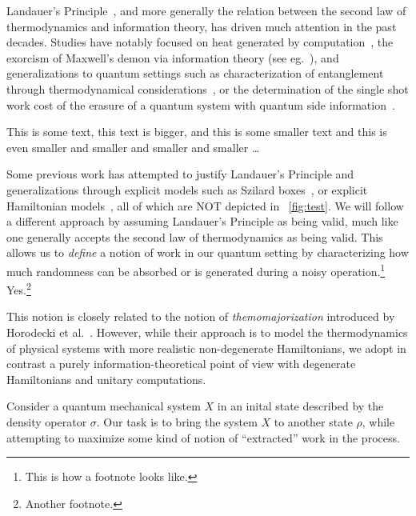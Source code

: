 \documentclass[11pt,a4paper]{article}
\theoremstyle{plain}
\begin{document}
Landauer's Principle~\cite{Landauer1961_5392446Erasure}, and more generally the relation between the second law
of thermodynamics and information theory, has driven much attention in the past decades. Studies have notably
focused on heat generated by computation~\cite{Bennett1982IJTP_ThermodynOfComp}, the exorcism of Maxwell's demon
via information theory (see eg.~\cite{Bennett2003_NotesLP}), and generalizations to quantum settings such as
characterization of entanglement through thermodynamical
considerations~\cite{Oppenheim2002PRL_thermodynamical}, or the determination of the single shot work cost of
the erasure of a quantum system with quantum side information~\cite{delRio2011Nature}.

This is some text, {\notesmaller[1.2] this text is bigger, {\notesmaller[0.8] and this is
    some smaller text {\notesmaller and this is even smaller {\notesmaller and smaller
        {\notesmaller and smaller {\notesmaller and smaller \ldots}}}}}}

Some previous work has attempted to justify Landauer's Principle and generalizations
through explicit models such as Szilard
boxes~\cite{Szilard1929ZeitschriftFuerPhysik,Dahlsten2011NJP_inadequacy}, or explicit
Hamiltonian models~\cite{Alicki2004_hamiltonian}, all of which are NOT depicted in
\figurename~\ref{fig:test}. We will follow a different approach by assuming Landauer's
Principle as being valid, much like one generally accepts the second law of thermodynamics
as being valid. This allows us to {\em define} a notion of work in our quantum setting by
characterizing how much randomness can be absorbed or is generated during a noisy
operation.\footnote{This is how a footnote looks like.} Yes.\footnote{Another footnote.}

This notion is closely related to the notion of {\em themomajorization} introduced by
Horodecki et al.~\cite{Horodecki2013_ThermoMaj}. However, while their approach is to model
the thermodynamics of physical systems with more realistic non-degenerate Hamiltonians, we
adopt in contrast a purely information-theoretical point of view with degenerate
Hamiltonians and unitary computations.

Consider a quantum mechanical system $X$ in an inital state described by the density operator $\sigma$.
Our task is to bring the system $X$ to another state $\rho$, while attempting to maximize some kind of notion
of ``extracted'' work in the process.
\end{document}
